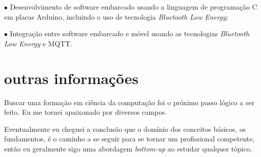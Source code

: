 \documentclass[]{../document-class/TwentySecondsCurriculumVitae-LaTex/twentysecondcv}
\begin{document}
\begin{twenty}
{			
		$\bullet$ Desenvolvimento de software embarcado usando a linguagem de programação C em placas Arduino, incluindo o uso de tecnologia \textit{Bluetooth Low Energy};\vskip 4pt 
		

		$\bullet$ Integração entre software embarcado e móvel usando as tecnologias \textit{Bluetooth Low Energy} e MQTT.}

		


\end{twenty}


\section{outras informações}

Buscar uma formação em ciência da computação foi o próximo passo lógico a ser feito. Eu me tornei apaixonado por diversos campos.

Eventualmente eu cheguei a conclusão que o domínio dos conceitos básicos, os fundamentos, é o caminho a se seguir para se tornar um profissional competente, então eu geralmente sigo uma abordagem \textit{bottom-up} ao estudar qualquer tópico.





\end{document}
